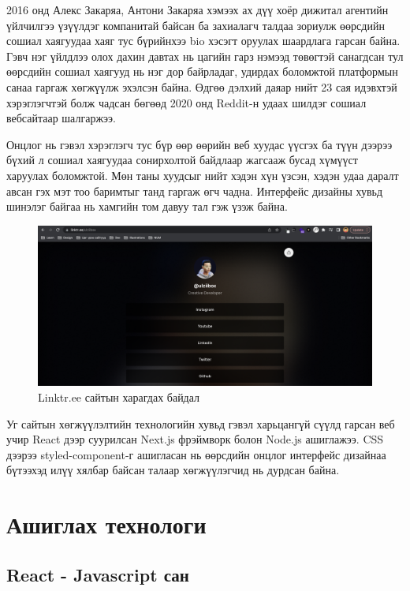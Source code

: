 2016 онд Алекс Закаряа, Антони Закаряа хэмээх ах дүү хоёр дижитал агентийн үйлчилгээ үзүүлдэг компанитай байсан ба захиалагч талдаа зориулж өөрсдийн сошиал хаягуудаа хаяг тус бүрийнхээ bio хэсэгт оруулах шаардлага гарсан байна. Гэвч нэг үйлдлээ олох дахин давтах нь цагийн гарз нэмээд төвөгтэй санагдсан тул өөрсдийн сошиал хаягууд нь нэг дор байрладаг, удирдах боломжтой платформын санаа гаргаж хөгжүүлж эхэлсэн байна. Өдгөө дэлхий даяар нийт 23 сая идэвхтэй хэрэглэгчтэй болж чадсан бөгөөд 2020 онд Reddit-н удаах шилдэг сошиал вебсайтаар шалгаржээ. 

Онцлог нь гэвэл хэрэглэгч тус бүр өөр өөрийн веб хуудас үүсгэх ба түүн дээрээ бүхий л сошиал хаягуудаа сонирхолтой байдлаар жагсааж бусад хүмүүст харуулах боломжтой. Мөн таны хуудсыг нийт хэдэн хүн үзсэн, хэдэн удаа даралт авсан гэх мэт тоо баримтыг танд гаргаж өгч чадна. Интерфейс дизайны хувьд шинэлэг байгаа нь хамгийн том давуу тал гэж үзэж байна. 

\begin{figure}[h]
	\centering
	\includegraphics[width=15cm]{images/linktree.png}
	\caption{Linktr.ee сайтын харагдах байдал}
	\label{fig:linktree}
\end{figure}

Уг сайтын хөгжүүлэлтийн технологийн хувьд гэвэл харьцангүй сүүлд гарсан веб учир React дээр суурилсан Next.js фрэймворк болон Node.js ашиглажээ. CSS дээрээ styled-component-г ашигласан нь өөрсдийн онцлог интерфейс дизайнаа бүтээхэд илүү хялбар байсан талаар хөгжүүлэгчид нь дурдсан байна.

\section{Ашиглах технологи}

\subsection{React - Javascript сан}

